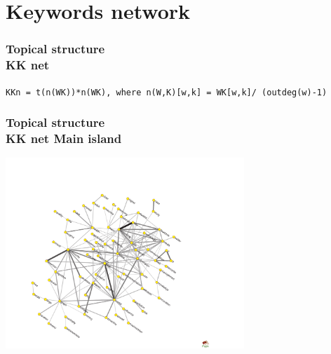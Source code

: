 \documentclass[hyperref={pdfstartview={FitBH -32768},
                         pdfpagemode=FullScreen,
                         plainpages=false,
                         colorlinks=true}
              ]{beamer}
\begin{document}
\section{Keywords network}  

\begin{frame}[fragile]
\frametitle{Topical structure \\ \normalsize KK net}
\small 

\texttt{KKn = t(n(WK))*n(WK), where n(W,K)[w,k] = WK[w,k]/ (outdeg(w)-1)} \medskip

\end{frame}

\begin{frame}[fragile]
\frametitle{Topical structure \\ \normalsize KK net Main island}
\small 
\begin{center}
\includegraphics[width=90mm]{KKmain.pdf}
\end{center}

\end{frame}

\end{document}
